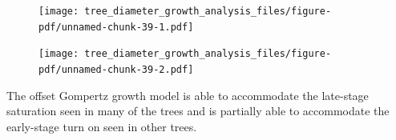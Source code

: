 \documentclass[
  letterpaper,
  DIV=11,
  numbers=noendperiod]{scrartcl}
\begin{document}
\begin{figure}[H]

{\centering \texttt{[image: tree\_diameter\_growth\_analysis\_files/figure-pdf/unnamed-chunk-39-1.pdf]}

}

\end{figure}

\begin{figure}[H]

{\centering \texttt{[image: tree\_diameter\_growth\_analysis\_files/figure-pdf/unnamed-chunk-39-2.pdf]}

}

\end{figure}

The offset Gompertz growth model is able to accommodate the late-stage
saturation seen in many of the trees and is partially able to
accommodate the early-stage turn on seen in other trees.
\end{document}
